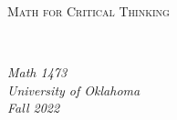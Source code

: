\documentclass[notes]{subfiles}
\begin{document}
\rhead{}
\lhead{}
\chead{}
\thispagestyle{empty}
\[\]
\vspace{1in}
\begin{center}
	\begin{Huge}
		\textsc{Math for Critical Thinking}
	\end{Huge}\\
		\vspace{2in}
	\begin{Large}
		\emph{Math 1473}\\
		\emph{University of Oklahoma}\\
		\emph{Fall 2022}
	\end{Large}\\
\end{center}
\vspace{2in}
\newpage
\thispagestyle{empty}
	\[\]
\end{document}
